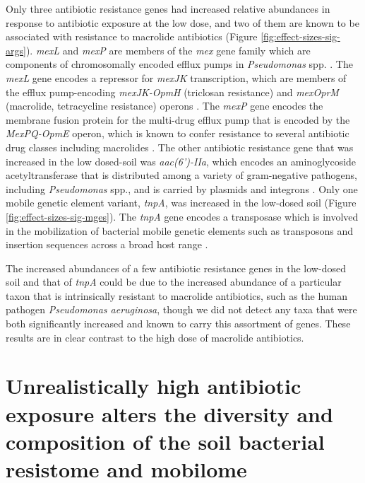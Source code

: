 Only three antibiotic resistance genes had increased relative abundances in response to antibiotic exposure at the low dose, and two of them are known to be associated with resistance to macrolide antibiotics (Figure \ref{fig:effect-sizes-sig-args}).
\textit{mexL} and \textit{mexP} are members of the \textit{mex} gene family which are components of chromosomally encoded efflux pumps in \textit{Pseudomonas} spp. \parencite{Mima.2005, Chuanchuen.2005}.
The \textit{mexL} gene encodes a repressor for \textit{mexJK} transcription, which are members of the efflux pump-encoding \textit{mexJK-OpmH} (triclosan resistance) and \textit{mexOprM} (macrolide, tetracycline resistance) operons \parencite{Chuanchuen.2005}.
The \textit{mexP} gene encodes the membrane fusion protein for the multi-drug efflux pump that is encoded by the \textit{MexPQ-OpmE} operon, which is known to confer resistance to several antibiotic drug classes including macrolides \parencite{Mima.2005}.
The other antibiotic resistance gene that was increased in the low dosed-soil was \textit{aac(6')-IIa}, which encodes an aminoglycoside acetyltransferase that is distributed among a variety of gram-negative pathogens, including \textit{Pseudomonas} spp., and is carried by plasmids and integrons \parencite{Shaw.1989, Partridge.2009}.
Only one mobile genetic element variant, \textit{tnpA}, was increased in the low-dosed soil (Figure \ref{fig:effect-sizes-sig-mges}).
The \textit{tnpA} gene encodes a transposase which is involved in the mobilization of bacterial mobile genetic elements such as transposons and insertion sequences across a broad host range \parencite{Partridge.2018}.

The increased abundances of a few antibiotic resistance genes in the low-dosed soil and that of \textit{tnpA} could be due to the increased abundance of a particular taxon that is intrinsically resistant to macrolide antibiotics, such as the human pathogen \textit{Pseudomonas aeruginosa}, though we did not detect any taxa that were both significantly increased and known to carry this assortment of genes.
These results are in clear contrast to the high dose of macrolide antibiotics.

\section{Unrealistically high antibiotic exposure alters the diversity and composition of the soil bacterial resistome and mobilome}

